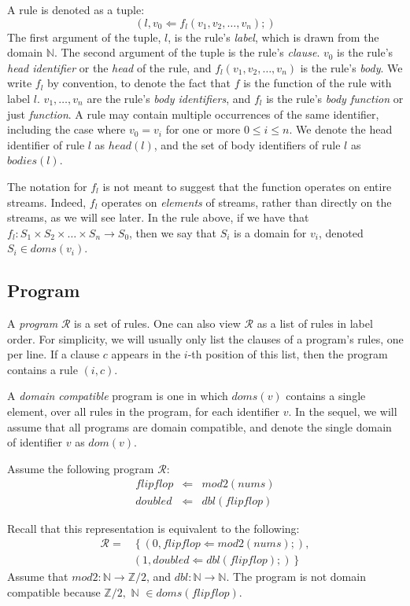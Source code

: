 A rule is denoted as a tuple: $$(l, v_0 \Leftarrow f_l(v_1, v_2, \dots, v_n);)$$  The first argument of the tuple, $l$, is the rule's {\em label}, which is drawn from the domain $\mathbb{N}$.  The second argument of the tuple is the rule's {\em clause}. $v_0$ is the rule's {\em head identifier} or the {\em head} of the rule, and $f_l(v_1, v_2, \dots, v_n)$ is the rule's {\em body}.  We write $f_l$ by convention, to denote the fact that $f$ is the function of the rule with label $l$.  $v_1, \dots, v_n$ are the rule's {\em body identifiers}, and $f_l$ is the rule's {\em body function} or just {\em function}.  A rule may contain multiple occurrences of the same identifier, including the case where $v_0 = v_i$ for one or more $0 \leq i \leq n$.  We denote the head identifier of rule $l$ as $head(l)$, and the set of body identifiers of rule $l$ as $bodies(l)$.

The notation for $f_l$ is not meant to suggest that the function operates on entire streams.  Indeed, $f_l$ operates on {\em elements} of streams, rather than directly on the streams, as we will see later.  In the rule above, if we have that $f_l : S_1 \times S_2 \times \dots \times S_n \rightarrow S_0$, then we say that $S_i$ is a domain for $v_i$, denoted $S_i \in doms(v_i)$.

\subsection{Program}
A {\em program} $\mathcal{R}$ is a set of rules.  One can also view $\mathcal{R}$ as a list of rules in label order.  For simplicity, we will usually only list the clauses of a program's rules, one per line.  If a clause $c$ appears in the $i$-th position of this list, then the program contains a rule $(i,c)$.

A {\em domain compatible} program is one in which $doms(v)$ contains a single element, over all rules in the program, for each identifier $v$.  In the sequel, we will assume that all programs are domain compatible, and denote the single domain of identifier $v$ as $dom(v)$.

\begin{example}
Assume the following program $\mathcal{R}$:
\begin{eqnarray*}
flipflop & \Leftarrow & mod2(nums) \\
doubled & \Leftarrow & dbl(flipflop)
\end{eqnarray*}

Recall that this representation is equivalent to the following:
\begin{equation*}
\begin{split}
\mathcal{R} = & \left\{(0, flipflop \Leftarrow mod2(nums);), \right. \\
& \left. (1, doubled \Leftarrow dbl(flipflop);) \right\}
\end{split}
\end{equation*}
Assume that $mod2 : \mathbb{N} \rightarrow \mathbb{Z}/2$, and $dbl : \mathbb{N} \rightarrow \mathbb{N}$.  The program is not domain compatible because $\mathbb{Z}/2, \,\, \mathbb{N} \,\, \in doms(flipflop)$.
\end{example}

